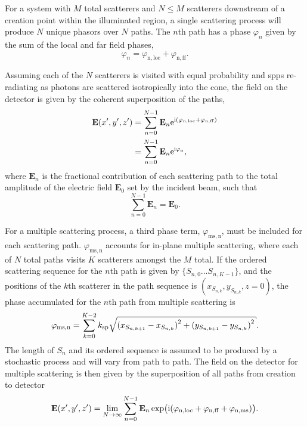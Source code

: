 For a system with $M$ total scatterers and $N \leq M$ scatterers downstream of
a creation point within the illuminated region, a single scattering process
will produce $N$ unique phasors over $N$ paths.  The $n$th path has a
phase $\varphi_n$ given by the sum of the local and far field phases,
\begin{equation}
\varphi_n = \varphi_\mathrm{n,loc}+\varphi_\mathrm{n,ff}.
\end{equation}

Assuming each of the $N$ scatterers is visited with equal probability and \glspl{spp}
re-radiating as photons are scattered isotropically into the cone, the field
on the detector is given by the coherent superposition of the paths,
\begin{align}
\mathbf{E}(x^\prime,y^\prime,z^\prime) &=
\sum_{n=0}^{N-1}
\mathbf{E}_n {\mathrm{e}}^{{\mathrm{i}}{(\varphi_\mathrm{n,loc}+\varphi_\mathrm{n,ff})}}\\
&=
\sum_{n=0}^{N-1}
\mathbf{E}_n {\mathrm{e}}^{{\mathrm{i}}{\varphi_\mathrm{n}}},
\end{align}
where $\mathbf{E}_n$ is the fractional contribution of each scattering path to
the total amplitude of the electric field $\mathbf{E}_0$ set by the incident
beam, such that
\begin{equation}
\sum_{n=0}^{N-1}\mathbf{E}_n = \mathbf{E}_0.
\end{equation}

For a multiple scattering process, a third phase term,
$\varphi_\mathrm{ms,n}$, must be included for each scattering path.
$\varphi_\mathrm{ms,n}$ accounts for in-plane multiple scattering, where each
of $N$ total paths visits $K$ scatterers amongst the $M$ total.  If the
ordered scattering sequence for the $n$th path is given by $\{S_{n,0} \ldots
S_{n,{K-1}}\}$, and the positions of the $k$th scatterer in the path sequence
is $(x_{S_{n,k}},y_{S_{n,k}},z=0)$, the phase accumulated for the $n$th path from
multiple scattering is
\begin{equation}
\varphi_\mathrm{ms,n}=\sum_{k=0}^{K-2}
\ksp \sqrt{{(x_{S_{n,{k+1}}}-x_{S_{n,k}})}^2+{(y_{S_{n,{k+1}}}-y_{S_{n,k}})}^2}.
\label{eqn:multiplescatteringphase}
\end{equation}
The length of $S_n$ and its ordered sequence is assumed to be produced by a stochastic
process and will vary from path to path.  The field on the detector
for multiple scattering is then given by the superposition of all paths from
creation to detector
\begin{equation}
\mathbf{E}(x^\prime,y^\prime,z^\prime) =
\lim_{N\to\infty}
\sum_{n=0}^{N-1}
\mathbf{E}_n
\exp\!\big({{\mathrm{i}}{(\varphi_\mathrm{n,loc}+\varphi_\mathrm{n,ff}+\varphi_\mathrm{n,ms})}}\big).
\label{eqn:smicromsphase}
\end{equation}

